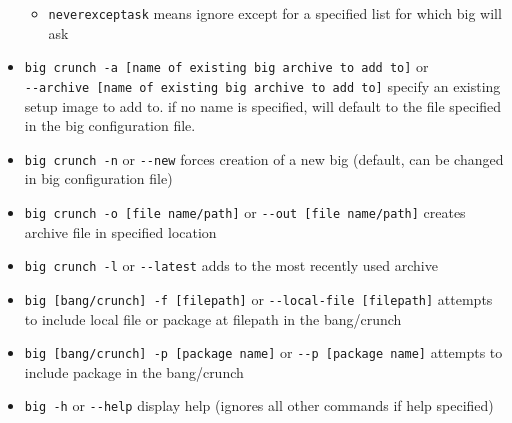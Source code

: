 \documentclass[12pt]{article}
\begin{document}
\begin{itemize}
\begin{itemize}
                \item \verb+neverexceptask+ means ignore except for a specified list for which big will ask
            \end{itemize}
            \item \verb+big crunch -a [name of existing big archive to add to]+ or \\ \verb+--archive [name of existing big archive to add to]+ specify an existing setup image to add to.  if no name is specified, will default to the file specified in the big configuration file.
            \item \verb+big crunch -n+ or \verb+--new+ forces creation of a new big (default, can be changed in big configuration file)
            \item \verb+big crunch -o [file name/path]+ or \verb+--out [file name/path]+ creates archive file in specified location
            \item \verb+big crunch -l+ or \verb+--latest+ adds to the most recently used archive
            \item \verb+big [bang/crunch] -f [filepath]+ or \verb+--local-file [filepath]+ attempts to include local file or package at filepath in the bang/crunch
            \item \verb+big [bang/crunch] -p [package name]+ or \verb+--p [package name]+ attempts to include package in the bang/crunch
            \item \verb+big -h+ or \verb+--help+ display help (ignores all other commands if help specified)
        \end{itemize}
\end{document}
